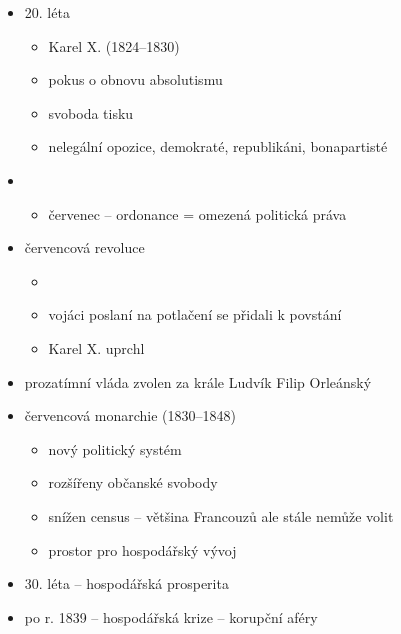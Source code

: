 \begin{itemize}
\item 20. léta
	\begin{itemize}
	\item Karel X. (1824--1830)
	\item pokus o obnovu absolutismu
	\item svoboda tisku
	\item nelegální opozice, demokraté, republikáni, bonapartisté
	\end{itemize}



\item {}
	\begin{itemize}
	\item červenec -- ordonance = omezená politická práva
	\end{itemize}
\item červencová revoluce
	\begin{itemize}
	\item {}
	\item vojáci poslaní na potlačení se přidali k povstání
	\item[\ra] Karel X. uprchl
	\end{itemize}
\item prozatímní vláda \ra zvolen za krále Ludvík Filip Orleánský
\item červencová monarchie (1830--1848)
	\begin{itemize}
	\item nový politický systém
	\item rozšířeny občanské svobody
	\item snížen census -- většina Francouzů ale stále nemůže volit
	\item prostor pro hospodářský vývoj
	\end{itemize}
\item 30. léta -- hospodářská prosperita
\item po r. 1839 -- hospodářská krize -- korupční aféry
\end{itemize}

